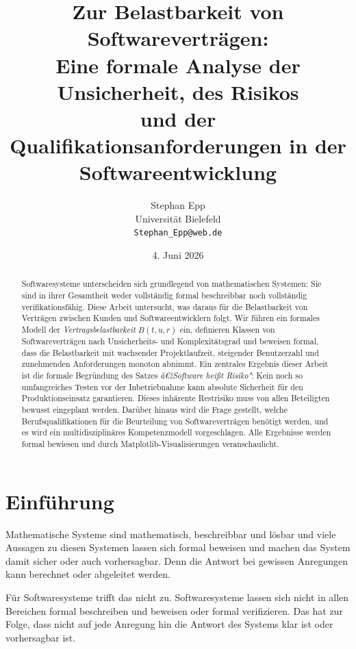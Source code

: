 ﻿\documentclass[a4paper,12pt]{article}
\title{Zur Belastbarkeit von Softwarevertr\"agen:\\
Eine formale Analyse der Unsicherheit, des Risikos\\
und der Qualifikationsanforderungen in der\\
Softwareentwicklung}
\author{Stephan Epp\\
\small Universit\"at Bielefeld\\
\small \texttt{Stephan\_Epp@web.de}}
\date{4. Juni 2026}
\theoremstyle{definition}
\begin{document}
\maketitle

\begin{abstract}
Softwaresysteme unterscheiden sich grundlegend von mathematischen Systemen: Sie sind in ihrer
Gesamtheit weder vollst\"andig formal beschreibbar noch vollst\"andig verifikationsf\"ahig.
Diese Arbeit untersucht, was daraus f\"ur die Belastbarkeit von Vertr\"agen zwischen Kunden
und Softwareentwicklern folgt. Wir f\"uhren ein formales Modell der \emph{Vertragsbelastbarkeit}
$B(t, u, r)$ ein, definieren Klassen von Softwarevertr\"agen nach Unsicherheits- und
Komplexit\"atsgrad und beweisen formal, dass die Belastbarkeit mit wachsender Projektlaufzeit,
steigender Benutzerzahl und zunehmenden Anforderungen monoton abnimmt. Ein zentrales Ergebnis
dieser Arbeit ist die formale Begr\"undung des Satzes \emph{â€žSoftware hei\ss{}t Risiko"}:
Kein noch so umfangreiches Testen vor der Inbetriebnahme kann absolute Sicherheit f\"ur den
Produktionseinsatz garantieren. Dieses inhärente Restrisiko muss von allen Beteiligten
bewusst eingeplant werden. Dar\"uber hinaus wird die Frage gestellt, welche
Berufsqualifikationen f\"ur die Beurteilung von Softwarevertr\"agen ben\"otigt werden, und
es wird ein multidisziplin\"ares Kompetenzmodell vorgeschlagen. Alle Ergebnisse werden
formal bewiesen und durch Matplotlib-Visualisierungen veranschaulicht.
\end{abstract}

\tableofcontents
\newpage

\section{Einf\"uhrung}

Mathematische Systeme sind mathematisch, beschreibbar und l\"osbar und viele Aussagen zu
diesen Systemen lassen sich formal beweisen und machen das System damit sicher oder auch
vorhersagbar. Denn die Antwort bei gewissen Anregungen kann berechnet oder abgeleitet werden.

F\"ur Softwaresysteme trifft das nicht zu. Softwaresysteme lassen sich nicht in allen
Bereichen formal beschreiben und beweisen oder formal verifizieren. Das hat zur Folge, dass
nicht auf jede Anregung hin die Antwort des Systems klar ist oder vorhersagbar ist.
\end{document}
